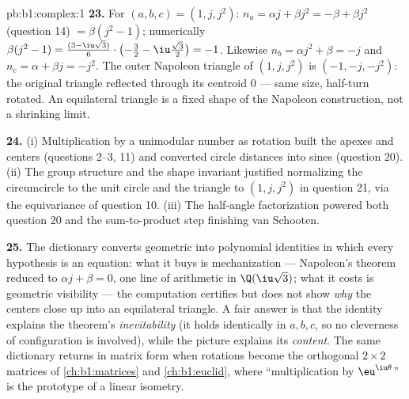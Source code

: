 \begin{solution}{pb:b1:complex:1}
\textbf{23.} For $(a, b, c) = (1, j, j^2)$: $n_a = \alpha j +
\beta j^2 = -\beta + \beta j^2$ (question 14) $= \beta(j^2 - 1)$;
numerically $\beta(j^2 - 1) = \frac{(3 - \iu\sqrt3)}6 \cdot
\bigl(-\frac32 - \iu\frac{\sqrt3}2\bigr) = -1$. Likewise $n_b =
\alpha j^2 + \beta = -j$ and $n_c = \alpha + \beta j = -j^2$. The
outer Napoleon triangle of $(1, j, j^2)$ is $(-1, -j, -j^2)$: the
original triangle reflected through its centroid $0$ --- same
size, half-turn rotated. An equilateral triangle is a fixed shape
of the Napoleon construction, not a shrinking limit.

\textbf{24.} (i) Multiplication by a unimodular number as rotation
built the apexes and centers (questions 2--3, 11) and converted
circle distances into sines (question 20). (ii) The group
structure and the shape invariant justified normalizing the
circumcircle to the unit circle and the triangle to $(1, j, j^2)$
in question 21, via the equivariance of question 10. (iii) The
half-angle factorization powered both question 20 and the
sum-to-product step finishing van Schooten.

\textbf{25.} The dictionary converts geometric  into
polynomial identities in which every hypothesis is an equation:
what it buys is mechanization --- Napoleon's theorem reduced to
$\alpha j + \beta = 0$, one line of arithmetic in
$\Q(\iu\sqrt3)$; what it costs is geometric visibility --- the
computation certifies but does not show \emph{why} the centers
close up into an equilateral triangle. A fair answer is that the
identity explains the theorem's \emph{inevitability} (it holds
identically in $a, b, c$, so no cleverness of configuration is
involved), while the picture explains its \emph{content}. The same
dictionary returns in matrix form when rotations become the
orthogonal $2 \times 2$ matrices of \cref{ch:b1:matrices} and
\cref{ch:b1:euclid}, where ``multiplication by
$\eu^{\iu\theta}$'' is the prototype of a linear isometry.
\end{solution}
